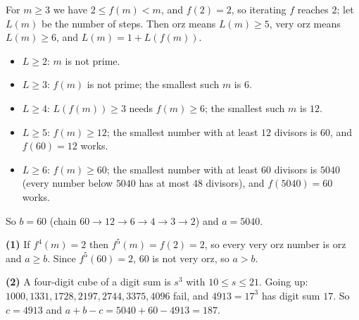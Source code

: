 For $m\ge3$ we have $2\le f(m)<m$, and $f(2)=2$, so iterating $f$ reaches $2$; let $L(m)$ be the number of steps. Then orz means $L(m)\ge5$, very orz means $L(m)\ge6$, and $L(m)=1+L(f(m))$.
\begin{itemize}
\item $L\ge2$: $m$ is not prime.
\item $L\ge3$: $f(m)$ is not prime; the smallest such $m$ is $6$.
\item $L\ge4$: $L(f(m))\ge3$ needs $f(m)\ge6$; the smallest such $m$ is $12$.
\item $L\ge5$: $f(m)\ge12$; the smallest number with at least $12$ divisors is $60$, and $f(60)=12$ works.
\item $L\ge6$: $f(m)\ge60$; the smallest number with at least $60$ divisors is $5040$ (every number below $5040$ has at most $48$ divisors), and $f(5040)=60$ works.
\end{itemize}
So $b=60$ (chain $60\to12\to6\to4\to3\to2$) and $a=5040$.

\textbf{(1)} If $f^4(m)=2$ then $f^5(m)=f(2)=2$, so every very orz number is orz and $a\ge b$. Since $f^5(60)=2$, $60$ is not very orz, so $a>b$.

\textbf{(2)} A four-digit cube of a digit sum is $s^3$ with $10\le s\le21$. Going up: $1000,1331,1728,2197,2744,3375,4096$ fail, and $4913=17^3$ has digit sum $17$. So $c=4913$ and $a+b-c=5040+60-4913=\boxed{187}$.
